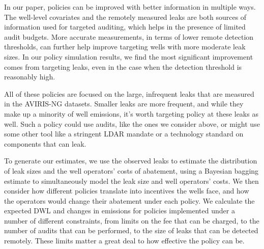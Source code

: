 In our paper, policies can be improved with better information in multiple ways.
The well-level covariates and the remotely measured leaks are both sources of information used for targeted auditing, which helps in the presence of limited audit budgets.
More accurate measurements, in terms of lower remote detection thresholds, can further help improve targeting wells with more moderate leak sizes.
In our policy simulation results, we find the most significant improvement comes from targeting leaks, even in the case when the detection threshold is reasonably high.

All of these policies are focused on the large, infrequent leaks that are measured in the \gls{AVIRIS-NG} datasets.
Smaller leaks are more frequent, and while they make up a minority of well emissions, it's worth targeting policy at these leaks as well.
Such a policy could use audits, like the ones we consider above, or might use some other tool like a stringent
\gls{LDAR} %
mandate or a technology standard on components that can leak.

To generate our estimates, we use the observed leaks to estimate the distribution of leak sizes and the well operators' costs of abatement, using a Bayesian bagging estimate to simultaneously model the leak size and well operators' costs.
We then consider how different policies translate into incentives the wells face, and how the operators would change their abatement under each policy.
We calculate the expected \gls{DWL} and changes in emissions for policies implemented under a number of different constraints, from limits on the fee that can be charged, to the number of audits that can be performed, to the size of leaks that can be detected remotely.
These limits matter a great deal to how effective the policy can be.

